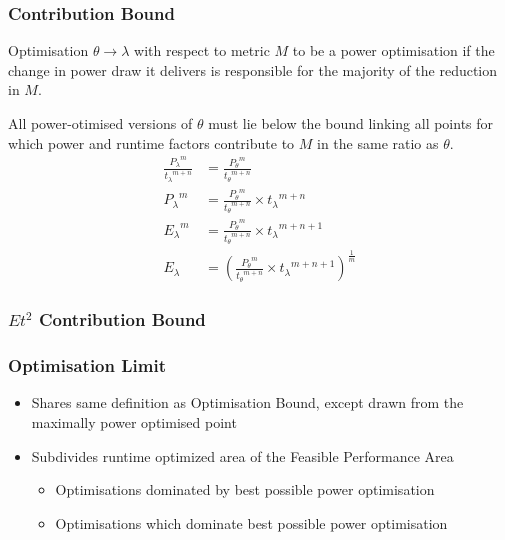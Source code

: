 \documentclass{beamer}
\begin{document}
  \begin{frame}
    \frametitle{Contribution Bound}
    \begin{definition}
      Optimisation $\theta \to \lambda$ with respect to metric $M$ to be a power optimisation if the change in power draw it delivers is responsible for the majority of the reduction in $M$. 
      \end{definition}
 All power-otimised versions of $\theta$ must lie below the bound linking all points for which power and runtime factors contribute to $M$ in the same ratio as $\theta$.
\begin{align}
\frac{{P_{\lambda}}^m}{{t_{\lambda}}^{m+n}} &= \frac{{P_{\theta}}^m}{{t_{\theta}}^{m+n}} \nonumber \\
 {P_{\lambda}}^m &= \frac{{P_{\theta}}^m}{{t_{\theta}}^{m+n}} \times {t_\lambda}^{m+n} \nonumber \\ 
 {E_{\lambda}}^m &= \frac{{P_{\theta}}^m}{{t_{\theta}}^{m+n}} \times {t_\lambda}^{m+n+1} \nonumber \\ 
  E_{\lambda} &= (\frac{{P_{\theta}}^m}{{t_{\theta}}^{m+n}} \times {t_\lambda}^{m+n+1})^{\frac{1}{m}} 
\end{align}
  \end{frame}

  \begin{frame}
    \frametitle{$Et^2$ Contribution Bound}
    \newcommand*{\OPTBOUND}{}%
    \newcommand*{\CONTBOUND}{}%
    \begin{figure}
    \centering
    
    \end{figure}
  \end{frame}


  \begin{frame}
    \frametitle{Optimisation Limit}
    \begin{itemize}
      \item Shares same definition as Optimisation Bound, except drawn from the maximally power optimised point
      \item Subdivides runtime optimized area of the Feasible Performance Area
      \begin{itemize}
        \item Optimisations dominated by best possible power optimisation
        \item Optimisations which dominate best possible power optimisation
      \end{itemize}
    \end{itemize}
  \end{frame}
\end{document}
